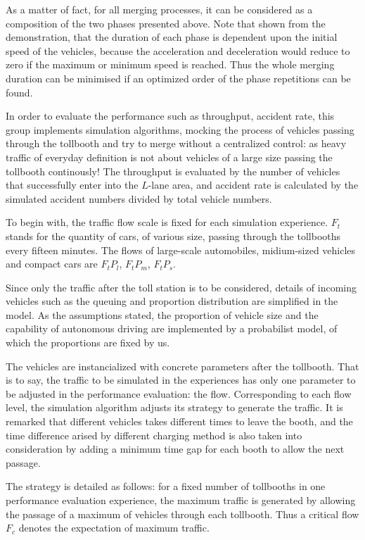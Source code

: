 \documentclass{mcmthesis}
\begin{document}
As a matter of fact, for all merging processes, it can be considered as a composition of the two phases presented above. Note that shown from the demonstration, that the duration of each phase is dependent upon the initial speed of the vehicles, because the acceleration and deceleration would reduce to zero if the maximum or minimum speed is reached. Thus the whole merging duration can be minimised if an optimized order of the phase repetitions can be found.



In order to evaluate the performance such as throughput, accident rate, this group implements simulation algorithms, mocking the process of vehicles passing through the tollbooth and try to merge without a centralized control: as heavy traffic of everyday definition is not about vehicles of a large size passing the tollbooth continously! The throughput is evaluated by the number of vehicles that successfully enter into the $L$-lane area, and accident rate is calculated by the simulated accident numbers divided by total vehicle numbers.

To begin with, the traffic flow scale is fixed for each simulation experience. $F_t$ stands for the quantity of cars, of various size, passing through the tollbooths every fifteen minutes. The flows of large-scale automobiles, midium-sized vehicles and compact cars are $F_tP_l$, $F_tP_m$, $F_tP_s$.

Since only the traffic after the toll station is to be considered, details of incoming vehicles such as the queuing and proportion distribution are simplified in the model. As the assumptions stated, the proportion of vehicle size and the capability of autonomous driving are implemented by a probabilist model, of which the proportions are fixed by us. 

The vehicles are instancialized with concrete parameters after the tollbooth. That is to say, the traffic to be simulated in the experiences has only one parameter to be adjusted in the performance evaluation: the flow. Corresponding to each flow level, the simulation algorithm adjusts its strategy to generate the traffic. It is remarked that different vehicles takes different times to leave the booth, and the time difference arised by different charging method is also taken into consideration by adding a minimum time gap for each booth to allow the next passage.

The strategy is detailed as follows: for a fixed number of tollbooths in one performance evaluation experience, the maximum traffic is generated by allowing the passage of a maximum of vehicles through each tollbooth. Thus a critical flow $F_c$ denotes the expectation of maximum traffic. 
\end{document}
